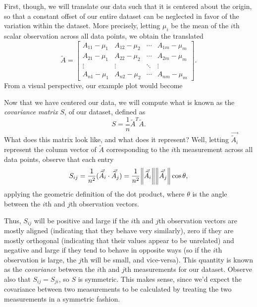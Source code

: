 \documentclass[letterpaper]{article}
\theoremstyle{remark}
\renewcommand{\tilde}[1]{\widetilde{#1}}
\newcommand{\mat}[1]{\ensuremath{\begin{bmatrix}#1\end{bmatrix}}}
\begin{document}
First, though, we will translate our data such that it is centered about the origin, so that a constant offset of our entire dataset can be neglected in favor of the variation within the dataset. More precisely, letting $\mu_i$ be the mean of the $i$th scalar observation across all data points, we obtain the translated
\[
    \tilde{A} = \mat{A_{11} - \mu_1 & A_{12} - \mu_2 & \cdots & A_{1m} - \mu_m \\ A_{21} - \mu_1 & A_{22} - \mu_2 & \cdots & A_{2m} - \mu_m \\ \vdots & \vdots & \ddots & \vdots \\ A_{n1} - \mu_1 & A_{n2} - \mu_2 & \cdots & A_{nm} - \mu_m}.
\]
From a visual perspective, our example plot would become
\begin{center}
\end{center}

Now that we have centered our data, we will compute what is known as the \emph{covariance matrix} $S$, of our dataset, defined as
\[
    S = \frac{1}{n} \tilde{A}^T\tilde{A}.
\]
What does this matrix look like, and what does it represent? Well, letting $\vec{\tilde{A}_i}$ represent the column vector of $\tilde{A}$ corresponding to the $i$th measurement across all data points, observe that each entry
\[
    S_{ij} = \frac{1}{n^2} (\vec{\tilde{A}_i} \cdot \vec{\tilde{A}_j}) = \frac{1}{n^2}\norm{\vec{\tilde{A}_i}}\norm{\vec{\tilde{A}_j}}\cos{\theta},
\]
applying the geometric definition of the dot product, where $\theta$ is the angle between the $i$th and $j$th observation vectors.

Thus, $S_{ij}$ will be positive and large if the $i$th and $j$th observation vectors are mostly aligned (indicating that they behave very similarly), zero if they are mostly orthogonal (indicating that their values appear to be unrelated) and negative and large if they tend to behave in opposite ways (so if the $i$th observation is large, the $j$th will be small, and vice-versa). This quantity is known as the \emph{covariance} between the $i$th and $j$th measurements for our dataset. Observe also that $S_{ij} = S_{ji}$, so $S$ is symmetric. This makes sense, since we'd expect the covariance between two measurements to be calculated by treating the two measurements in a symmetric fashion.
\end{document}
